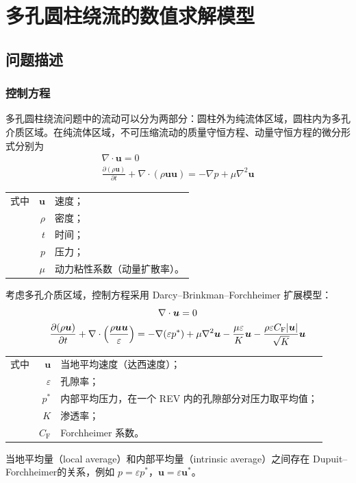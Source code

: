 \chapter{多孔圆柱绕流的数值求解模型}

\section{问题描述}\label{sec: problem description}

\subsection{控制方程} %

多孔圆柱绕流问题中的流动可以分为两部分：圆柱外为纯流体区域，圆柱内为多孔介质区域。在纯流体区域，不可压缩流动的质量守恒方程、动量守恒方程的微分形式分别为
\begin{gather}
	\nabla \cdot \bm{u} = 0 \\
	\frac{\partial(\rho\bm{u})}{\partial t} + \nabla \cdot (\rho\bm{u}\bm{u}) = -\nabla p + \mu\nabla^2\bm{u}
\end{gather}
\begin{tabularx}{\textwidth}{@{}l@{\quad}r@{——}X@{}}
	式中 & $\bm{u}$ & 速度；\\
		& $\rho$ & 密度；\\
		& $t$ & 时间；\\
		& $p$ & 压力；\\
		& $\mu$ & 动力粘性系数（动量扩散率）。
\end{tabularx}\vspace{3.15bp}


考虑多孔介质区域，控制方程采用 Darcy–Brinkman–Forchheimer 扩展模型：
\begin{gather}
	\nabla \cdot \bm{u} = 0 \\
	\frac{\partial(\rho\bm{u})}{\partial t} + 
	\nabla \cdot \left(\frac{\rho\bm{u}\bm{u}}{\varepsilon}\right) = 
	-\nabla (\varepsilon p^*) + \mu\nabla^2\bm{u} - 
	\frac{\mu\varepsilon}{K}\bm{u} - 
	\frac{\rho\varepsilon C_{\mathrm{F}}\lvert\bm{u}\vert}{\sqrt K}\bm{u}
\end{gather}
\begin{tabularx}{\textwidth}{@{}l@{\quad}r@{——}X@{}}
	式中 & $\bm{u}$ & 当地平均速度（达西速度）；\\
		& $\varepsilon$ & 孔隙率；\\
		& $p^*$ & 内部平均压力，在一个 REV 内的孔隙部分对压力取平均值；\\
		& $K$ & 渗透率；\\
		& $C_{\mathrm{F}}$ & Forchheimer 系数。
\end{tabularx}\vspace{3.15bp}
当地平均量（local average）和内部平均量（intrinsic average）之间存在 Dupuit–Forchheimer的关系，例如 $p=\varepsilon p^*$，$\bm{u}=\varepsilon \bm{u}^*$。


